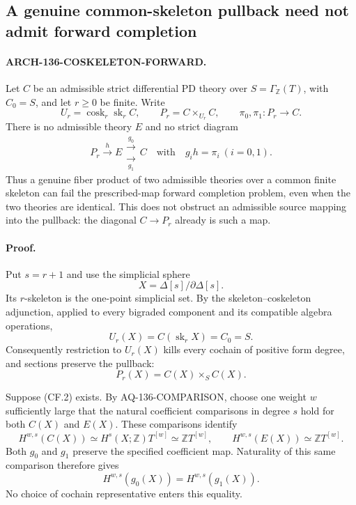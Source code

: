 \subsection{A genuine common-skeleton pullback need not admit forward completion}
\label{arch136:coskeleton-direction}

\paragraph{ARCH-136-COSKELETON-FORWARD.}
Let \(C\) be an admissible strict differential PD theory over
\(S=\Gamma_{\mathbb Z}(T)\), with \(C_0=S\), and let \(r\geq0\)
be finite. Write
\[
 U_r=\operatorname{cosk}_r\operatorname{sk}_r C,
 \qquad P_r=C\times_{U_r}C,
 \qquad \pi_0,\pi_1:P_r\longrightarrow C.
 \tag{CF.1}
\]
There is no admissible theory \(E\) and no strict diagram
\[
 P_r\xrightarrow{h}E
       \mathrel{\substack{\xrightarrow{g_0}\\[-.3ex]
                           \xrightarrow[g_1]{}}}C
 \quad\text{with}\quad g_i h=\pi_i\ (i=0,1).
 \tag{CF.2}
\]
Thus a genuine fiber product of two admissible theories over a
common finite skeleton can fail the prescribed-map forward
completion problem, even when the two theories are identical.
This does not obstruct an admissible source mapping into the
pullback: the diagonal \(C\to P_r\) already is such a map.

\paragraph{Proof.}
Put \(s=r+1\) and use the simplicial sphere
\[
                    X=\Delta[s]/\partial\Delta[s].
 \tag{CF.3}
\]
Its \(r\)-skeleton is the one-point simplicial set. By the
skeleton--coskeleton adjunction, applied to every bigraded
component and its compatible algebra operations,
\[
 U_r(X)=C(\operatorname{sk}_r X)=C_0=S.
 \tag{CF.4}
\]
Consequently restriction to \(U_r(X)\) kills every cochain of
positive form degree, and sections preserve the pullback:
\[
                     P_r(X)=C(X)\times_S C(X).
 \tag{CF.5}
\]

Suppose (CF.2) exists. By AQ-136-COMPARISON, choose one weight
\(w\) sufficiently large that the natural coefficient comparisons
in degree \(s\) hold for both \(C(X)\) and \(E(X)\). These
comparisons identify
\[
 H^{w,s}(C(X))\simeq
 H^s(X;\mathbb Z)T^{[w]}\simeq\mathbb ZT^{[w]},
 \qquad
 H^{w,s}(E(X))\simeq\mathbb ZT^{[w]}.
 \tag{CF.6}
\]
Both \(g_0\) and \(g_1\) preserve the specified coefficient
map. Naturality of this same comparison therefore gives
\[
          H^{w,s}(g_0(X))=H^{w,s}(g_1(X)).
 \tag{CF.7}
\]
No choice of cochain representative enters this equality.

